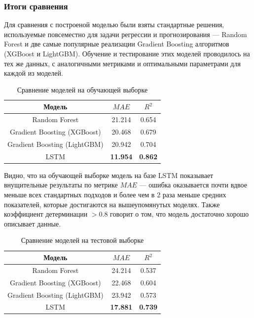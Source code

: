 \documentclass[14pt]{extarticle}
\begin{document}
\subsubsection{Итоги сравнения}

Для сравнения с построеной моделью были взяты стандартные решения, используемые повсеместно для задачи регрессии и прогнозирования --- Random Forest и две самые популярные реализации Gradient Boosting алгоритмов (XGBoost и LightGBM). Обучение и тестирование этих моделей проводилось на тех же данных, с аналогичными метриками и оптимальными параметрами для каждой из моделей.

\begin{center}
	\begin{table}[h]
		\centering
		\begin{tabular}{ccc}
			\hline Модель & $MAE$ &  $R^2$ \\
			\hline Random Forest & 21.214  & 0.654\\
			Gradient Boosting (XGBoost)  & 20.468 & 0.679 \\
			Gradient Boosting (LightGBM)  & 20.942 & 0.704 \\
			LSTM & {\bf 11.954}  & {\bf 0.862}\\
			\hline 
		\end{tabular}
		\caption{Сравнение моделей на обучающей выборке}
		\label{Tab:results1}
	\end{table}
\end{center}

Видно, что на обучающей выборке модель на базе LSTM показывает внущительные результаты по метрике $MAE$ --- ошибка оказывается почти вдвое меньше всех стандартных подходов и более чем в 2 раза меньше средних показателей, которые достигаются на вышеупомянутых моделях. Также коэффициент детерминации $>0.8$ говорит о том, что модель достаточно хорошо описывает данные.

\begin{center}
	\begin{table}[h]
		\centering
		\begin{tabular}{ccc}
			\hline Модель & $MAE$ &  $R^2$ \\
			\hline Random Forest & 24.214  & 0.537\\
			Gradient Boosting (XGBoost)  & 22.468 & 0.604 \\
			Gradient Boosting (LightGBM)  & 23.942 & 0.573 \\
			LSTM & {\bf 17.881}  & {\bf 0.739}\\
			\hline 
		\end{tabular}
		\caption{Сравнение моделей на тестовой выборке}
		\label{Tab:results2}
	\end{table}
\end{center}
\end{document}

